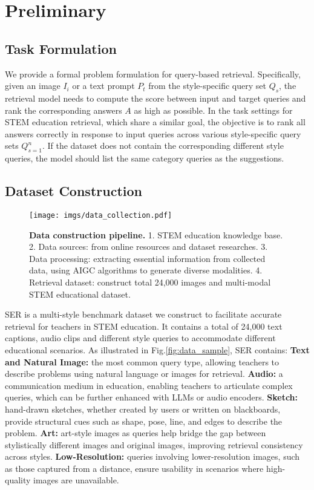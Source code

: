 \section{Preliminary}
\subsection{Task Formulation}
We provide a formal problem formulation for query-based retrieval.
Specifically, given an image $I_i$ or a text prompt $P_t$ from the style-specific query set $Q_s$, the retrieval model needs to compute the score between input and target queries and rank the corresponding answers $A$ as high as possible. In the task settings for STEM education retrieval, which share a similar goal, the objective is to rank all answers correctly in response to input queries across various style-specific query sets ${Q}_{s=1}^n$.
If the dataset does not contain the corresponding different style queries, the model should list the same category queries as the suggestions.

\subsection{Dataset Construction}
\begin{figure}[!tbp]
  \centering
   \texttt{[image: imgs/data\_collection.pdf]}
   \vspace{-7mm}
   \caption{\textbf{Data construction pipeline.} 1. STEM education knowledge base. 2. Data sources: from online resources and dataset researches. 3. Data processing: extracting essential information from collected data, using AIGC algorithms to generate diverse modalities. 4. Retrieval dataset: construct total 24,000 images and multi-modal STEM educational dataset.}
   \label{fig:data_collection}
   \vspace{-5mm}
\end{figure}
SER is a multi-style benchmark dataset we construct to facilitate accurate retrieval for teachers in STEM education. 
It contains a total of 24,000 text captions, audio clips and different style queries to accommodate different educational scenarios.
As illustrated in Fig.\ref{fig:data_sample}, SER contains:
{\bf Text and Natural Image:} the most common query type, allowing teachers to describe problems using natural language or images for retrieval.
{\bf Audio:} a communication medium in education, enabling teachers to articulate complex queries, which can be further enhanced with LLMs or audio encoders.
{\bf Sketch:} hand-drawn sketches, whether created by users or written on blackboards, provide structural cues such as shape, pose, line, and edges to describe the problem.
{\bf Art:} art-style images as queries help bridge the gap between stylistically different images and original images, improving retrieval consistency across styles. 
{\bf Low-Resolution:} queries involving lower-resolution images, such as those captured from a distance, ensure usability in scenarios where high-quality images are unavailable.

